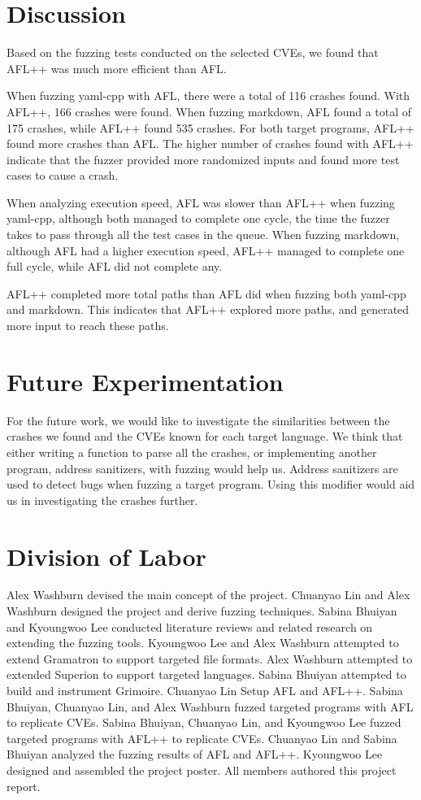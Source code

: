 \documentclass[12pt]{diazessay}
\begin{document}
\section*{Discussion}

Based on the fuzzing tests conducted on the selected CVEs, we found that AFL++ was much more efficient than AFL. 

When fuzzing yaml-cpp with AFL, there were a total of 116 crashes found. With AFL++, 166 crashes were found. When fuzzing markdown, AFL found a total of 175 crashes, while AFL++ found 535 crashes. For both target programs, AFL++ found more crashes than AFL. The higher number of crashes found with AFL++ indicate that the fuzzer provided more randomized inputs and found more test cases to cause a crash.

When analyzing execution speed, AFL was slower than AFL++ when fuzzing yaml-cpp, although both managed to complete one cycle, the time the fuzzer takes to pass through all the test cases in the queue. When fuzzing markdown, although AFL had a higher execution speed, AFL++ managed to complete one full cycle, while AFL did not complete any.

AFL++ completed more total paths than AFL did when fuzzing both yaml-cpp and markdown. This indicates that AFL++ explored more paths, and generated more input to reach these paths.


\section*{Future Experimentation}
For the future work, we would like to investigate the similarities between the crashes we found and the CVEs known for each target language. We think that either writing a function to parse all the crashes, or implementing another program, address sanitizers, with fuzzing would help us. Address sanitizers are used to detect bugs when fuzzing a target program. Using this modifier would aid us in investigating the crashes further.


\clearpage

\section*{Division of Labor}

Alex Washburn devised the main concept of the project.
Chuanyao Lin and Alex Washburn designed the project and derive fuzzing techniques.
Sabina Bhuiyan and Kyoungwoo Lee conducted literature reviews and related research on extending the fuzzing tools.
Kyoungwoo Lee and Alex Washburn attempted to extend Gramatron to support targeted file formats.
Alex Washburn attempted to extended Superion to support targeted languages.
Sabina Bhuiyan attempted to build and instrument Grimoire.
Chuanyao Lin Setup AFL and AFL++.
Sabina Bhuiyan, Chuanyao Lin, and Alex Washburn fuzzed targeted programs with AFL to replicate CVEs.
Sabina Bhuiyan, Chuanyao Lin, and Kyoungwoo Lee fuzzed targeted programs with AFL++ to replicate CVEs. 
Chuanyao Lin and Sabina Bhuiyan analyzed the fuzzing results of AFL and AFL++.
Kyoungwoo Lee designed and assembled the project poster.
All members authored this project report.
\end{document}
